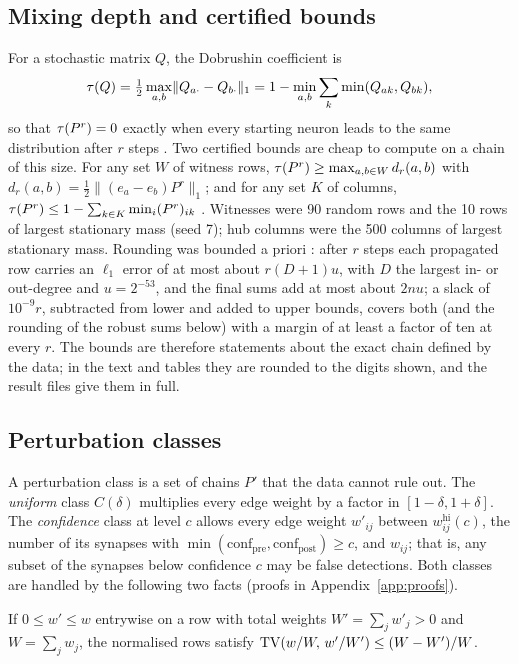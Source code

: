 \subsection{Mixing depth and certified bounds}

For a stochastic matrix $Q$, the Dobrushin coefficient is
\begin{equation}
  \tau(Q)=\tfrac12\max_{a,b}\lVert Q_{a\cdot}-Q_{b\cdot}\rVert_1 = 1-\min_{a,b}\sum_k \min(Q_{ak},Q_{bk}),
\end{equation}
so that $\tau(P^r)=0$ exactly when every starting neuron leads to the same distribution after $r$
steps \cite{dobrushin1956,seneta2006}. Two certified bounds are cheap to compute on a chain of this
size. For any set $W$ of witness rows,
$\tau(P^r)\ge\max_{a,b\in W}d_r(a,b)$ with $d_r(a,b)=\tfrac12\lVert(e_a-e_b)P^r\rVert_1$; and for any
set $K$ of columns, $\tau(P^r)\le 1-\sum_{k\in K}\min_i (P^r)_{ik}$ \cite{seneta2006}. Witnesses were
90 random rows and the 10 rows of largest stationary mass (seed 7); hub columns were the 500 columns
of largest stationary mass. Rounding was bounded a priori \cite{higham2002}: after $r$ steps each
propagated row carries an $\ell_1$ error of at most about $r(D+1)u$, with $D$ the largest in- or
out-degree and $u=2^{-53}$, and the final sums add at most about $2nu$; a slack of $10^{-9}r$,
subtracted from lower and added to upper bounds, covers both (and the rounding of the robust sums
below) with a margin of at least a factor of ten at every $r$. The bounds are therefore statements about the exact chain defined by the data; in the text and
tables they are rounded to the digits shown, and the result files give them in full.

\subsection{Perturbation classes}

A perturbation class is a set of chains $P'$ that the data cannot rule out. The \emph{uniform}
class $C(\delta)$ multiplies every edge weight by a factor in $[1-\delta,1+\delta]$. The
\emph{confidence} class at level $c$ allows every edge weight $w'_{ij}$ between $w^{\mathrm{hi}}_{ij}(c)$,
the number of its synapses with $\min(\text{conf}_\text{pre},\text{conf}_\text{post})\ge c$, and
$w_{ij}$; that is, any subset of the synapses below confidence $c$ may be false detections. Both
classes are handled by the following two facts (proofs in Appendix~\ref{app:proofs}).

\begin{lemma}\label{lem:row}
If $0\le w'\le w$ entrywise on a row with total weights $W'=\sum_j w'_j>0$ and $W=\sum_j w_j$, the
normalised rows satisfy $\operatorname{TV}(w/W,\,w'/W')\le (W-W')/W$.
\end{lemma}


